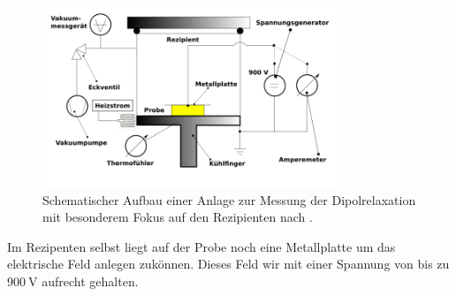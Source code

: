 \begin{figure}
    \centering
    \includegraphics[width=0.8\textwidth]{bilder/aufbau2.png}
    \caption{Schematischer Aufbau einer Anlage zur Messung der Dipolrelaxation mit 
            besonderem Fokus auf den Rezipienten nach 
            \cite{skript}.}
    \label{fig:aufbau2}
\end{figure}


Im Rezipenten selbst liegt auf der Probe noch eine Metallplatte um das elektrische Feld anlegen zukönnen.
Dieses Feld wir mit einer Spannung von bis zu $\SI{900}{\volt}$ aufrecht gehalten.
\\
\newline

